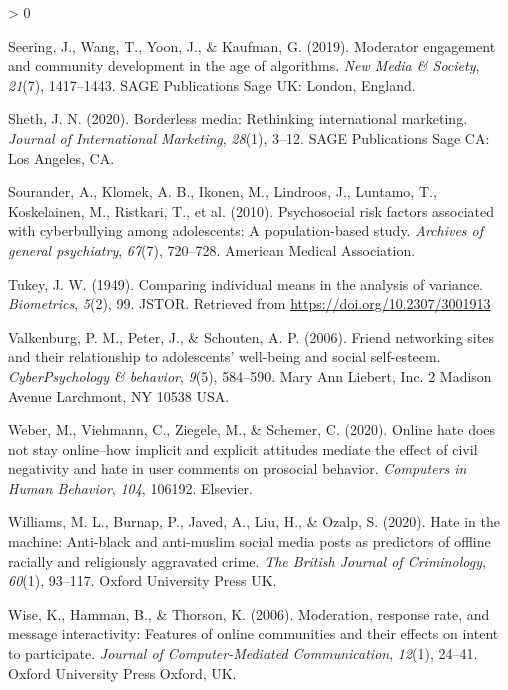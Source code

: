 \documentclass[
  10pt,
  dvipsnames]{scrartcl}
\newlength{\cslhangindent}
\newenvironment{CSLReferences}[2] %
 {%
  \setlength{\parindent}{0pt}
  \ifodd #1 \everypar{\setlength{\hangindent}{\cslhangindent}}\ignorespaces\fi
  \ifnum #2 > 0
  \setlength{\parskip}{#2\baselineskip}
  \fi
 }%
 {}
\begin{document}
\begin{CSLReferences}{1}{0}
\leavevmode\hypertarget{ref-seering2019moderator}{}%
Seering, J., Wang, T., Yoon, J., \& Kaufman, G. (2019). Moderator
engagement and community development in the age of algorithms. \emph{New
Media \& Society}, \emph{21}(7), 1417--1443. SAGE Publications Sage UK:
London, England.

\leavevmode\hypertarget{ref-sheth2020borderless}{}%
Sheth, J. N. (2020). Borderless media: Rethinking international
marketing. \emph{Journal of International Marketing}, \emph{28}(1),
3--12. SAGE Publications Sage CA: Los Angeles, CA.

\leavevmode\hypertarget{ref-sourander2010psychosocial}{}%
Sourander, A., Klomek, A. B., Ikonen, M., Lindroos, J., Luntamo, T.,
Koskelainen, M., Ristkari, T., et al. (2010). Psychosocial risk factors
associated with cyberbullying among adolescents: A population-based
study. \emph{Archives of general psychiatry}, \emph{67}(7), 720--728.
American Medical Association.

\leavevmode\hypertarget{ref-Tukey1949}{}%
Tukey, J. W. (1949). Comparing individual means in the analysis of
variance. \emph{Biometrics}, \emph{5}(2), 99. {JSTOR}. Retrieved from
\url{https://doi.org/10.2307/3001913}

\leavevmode\hypertarget{ref-valkenburg2006friend}{}%
Valkenburg, P. M., Peter, J., \& Schouten, A. P. (2006). Friend
networking sites and their relationship to adolescents' well-being and
social self-esteem. \emph{CyberPsychology \& behavior}, \emph{9}(5),
584--590. Mary Ann Liebert, Inc. 2 Madison Avenue Larchmont, NY 10538
USA.

\leavevmode\hypertarget{ref-weber2020online}{}%
Weber, M., Viehmann, C., Ziegele, M., \& Schemer, C. (2020). Online hate
does not stay online--how implicit and explicit attitudes mediate the
effect of civil negativity and hate in user comments on prosocial
behavior. \emph{Computers in Human Behavior}, \emph{104}, 106192.
Elsevier.

\leavevmode\hypertarget{ref-williams2020hate}{}%
Williams, M. L., Burnap, P., Javed, A., Liu, H., \& Ozalp, S. (2020).
Hate in the machine: Anti-black and anti-muslim social media posts as
predictors of offline racially and religiously aggravated crime.
\emph{The British Journal of Criminology}, \emph{60}(1), 93--117. Oxford
University Press UK.

\leavevmode\hypertarget{ref-wise2006moderation}{}%
Wise, K., Hamman, B., \& Thorson, K. (2006). Moderation, response rate,
and message interactivity: Features of online communities and their
effects on intent to participate. \emph{Journal of Computer-Mediated
Communication}, \emph{12}(1), 24--41. Oxford University Press Oxford,
UK.


\end{CSLReferences}
\end{document}
